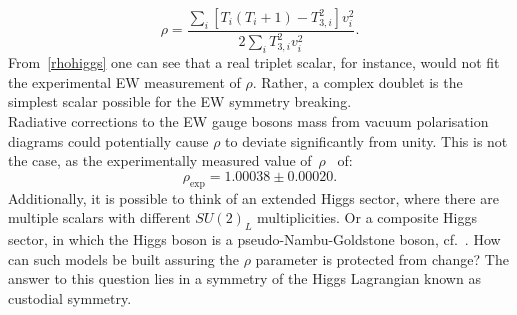 \begin{equation}
	\rho =\frac{\sum_i [T_{i}(T_{i}+1)-T_{3,i}^2]v_i^2}{2\sum_i T_{3,i}^2v_i^2}.
	\label{rhohiggs}
\end{equation}
From~\eqref{rhohiggs} one can see that a real triplet scalar, for instance, would not fit the experimental EW measurement of $\rho$. Rather, a complex doublet is the simplest scalar possible for the EW symmetry breaking.\\ Radiative corrections to the EW gauge bosons mass from vacuum polarisation diagrams could potentially cause $\rho$ to deviate significantly from unity.  This is not the case, as the experimentally measured value of~$\rho$~\cite{Zyla:2020zbs} of:
\begin{equation}
	\rho_{\text{exp}} = 1.00038 \pm 0.00020.
	\label{eq:rhoexp}
\end{equation}
Additionally, it is possible to think of an extended Higgs sector, where there are multiple scalars with different $SU(2)_L$ multiplicities. Or a composite Higgs sector, in which the Higgs boson is a pseudo-Nambu-Goldstone boson, cf.~\cite{Dugan1985AnatomyOA,Hill:2002ap}. How can such models be built assuring the $\rho$ parameter is protected from change? The answer to this question lies in a symmetry of the Higgs Lagrangian known as custodial symmetry. 
